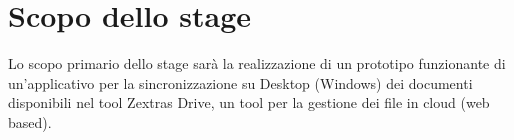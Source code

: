 \section*{Scopo dello stage}

Lo scopo primario dello stage sarà la realizzazione di un prototipo funzionante di un’applicativo per la sincronizzazione su Desktop (Windows) dei documenti disponibili nel tool Zextras Drive, un tool per la gestione dei file in cloud (web based).

